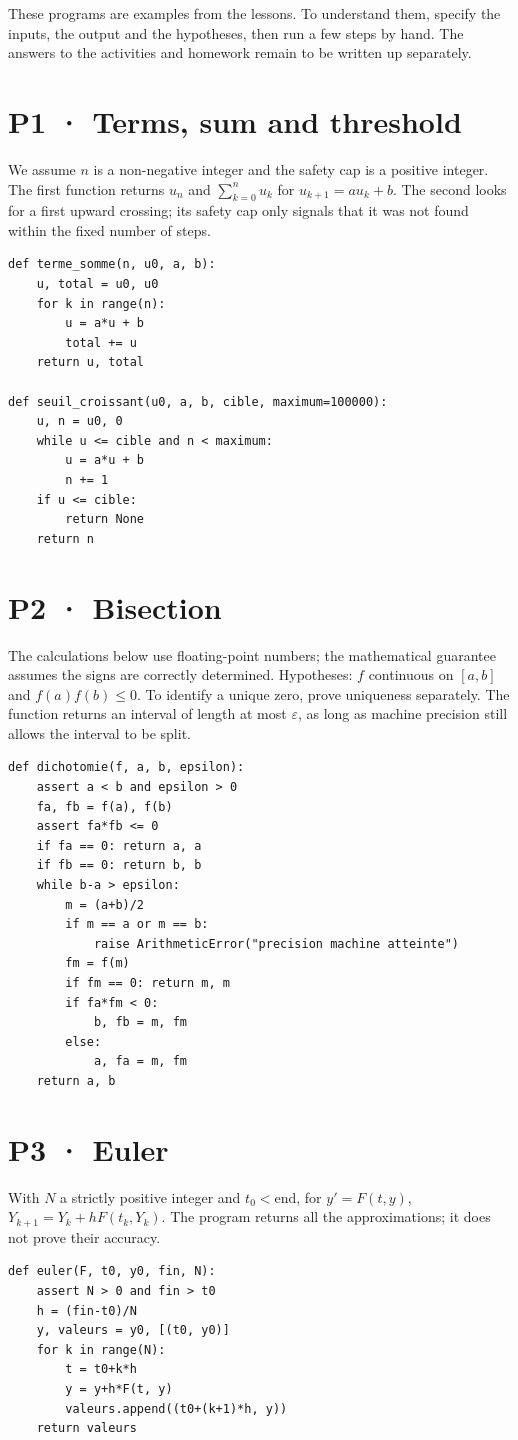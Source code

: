 These programs are examples from the lessons. To understand them, specify the inputs, the output and the hypotheses, then run a few steps by hand. The answers to the activities and homework remain to be written up separately.
\section{P1 · Terms, sum and threshold}
We assume $n$ is a non-negative integer and the safety cap is a positive integer. The first function returns $u_n$ and $\sum_{k=0}^n u_k$ for $u_{k+1}=au_k+b$. The second looks for a first upward crossing; its safety cap only signals that it was not found within the fixed number of steps.
\begin{lstlisting}
def terme_somme(n, u0, a, b):
    u, total = u0, u0
    for k in range(n):
        u = a*u + b
        total += u
    return u, total

def seuil_croissant(u0, a, b, cible, maximum=100000):
    u, n = u0, 0
    while u <= cible and n < maximum:
        u = a*u + b
        n += 1
    if u <= cible:
        return None
    return n
\end{lstlisting}
\section{P2 · Bisection}
The calculations below use floating-point numbers; the mathematical guarantee assumes the signs are correctly determined. Hypotheses: $f$ continuous on $[a,b]$ and $f(a)f(b)\le0$. To identify a unique zero, prove uniqueness separately. The function returns an interval of length at most $\varepsilon$, as long as machine precision still allows the interval to be split.
\begin{lstlisting}
def dichotomie(f, a, b, epsilon):
    assert a < b and epsilon > 0
    fa, fb = f(a), f(b)
    assert fa*fb <= 0
    if fa == 0: return a, a
    if fb == 0: return b, b
    while b-a > epsilon:
        m = (a+b)/2
        if m == a or m == b:
            raise ArithmeticError("precision machine atteinte")
        fm = f(m)
        if fm == 0: return m, m
        if fa*fm < 0:
            b, fb = m, fm
        else:
            a, fa = m, fm
    return a, b
\end{lstlisting}
\mxnewpage\section{P3 · Euler}
With $N$ a strictly positive integer and $t_0<\text{end}$, for $y'=F(t,y)$, $Y_{k+1}=Y_k+hF(t_k,Y_k)$. The program returns all the approximations; it does not prove their accuracy.
\begin{lstlisting}
def euler(F, t0, y0, fin, N):
    assert N > 0 and fin > t0
    h = (fin-t0)/N
    y, valeurs = y0, [(t0, y0)]
    for k in range(N):
        t = t0+k*h
        y = y+h*F(t, y)
        valeurs.append((t0+(k+1)*h, y))
    return valeurs
\end{lstlisting}
